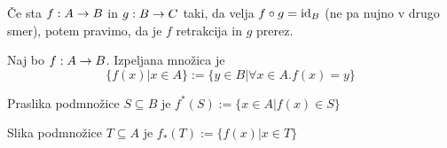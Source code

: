 
Če sta $f: A \to B$ in $g: B \to C$ taki, da velja $f \circ g = \mathrm{id}_B$ (ne pa nujno v drugo smer), potem pravimo, da je $f$ retrakcija in $g$ prerez.


Naj bo $f: A \to B$. Izpeljana množica je \[\{f(x) | x\in A\} := \{y \in B | \forall x \in A. f(x)=y\}\]


Praslika podmnožice $S \subseteq B$ je \(f^*(S) := \{x \in A | f(x) \in S\}\)

Slika podmnožice \(T \subseteq A\) je \(f_*(T) := \{f(x) | x \in T\}\)
